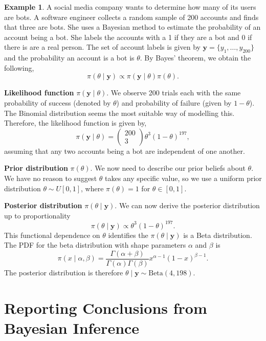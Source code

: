 \documentclass[
]{book}
\theoremstyle{definition}
\theoremstyle{definition}
\newtheorem{example}{Example}[chapter]
\theoremstyle{definition}
\theoremstyle{definition}
\theoremstyle{remark}
\begin{document}
\begin{example}
\protect\hypertarget{exm:binom}{}\label{exm:binom}A social media company wants to determine how many of its users are bots. A software engineer collects a random sample of 200 accounts and finds that three are bots. She uses a Bayesian method to estimate the probability of an account being a bot. She labels the accounts with a 1 if they are a bot and 0 if there is are a real person. The set of account labels is given by \(\boldsymbol{y} = \{y_1, \ldots, y_{200}\}\) and the probability an account is a bot is \(\theta\). By Bayes' theorem, we obtain the following,
\[
\pi(\theta \mid \boldsymbol{y}) \propto \pi(\boldsymbol{y}\mid \theta) \pi(\theta).
\]

\textbf{Likelihood function} \(\pi(\boldsymbol{y}\mid \theta)\). We observe 200 trials each with the same probability of success (denoted by \(\theta\)) and probability of failure (given by \(1-\theta\)). The Binomial distribution seems the most suitable way of modelling this. Therefore, the likelihood function is given by,
\[
\pi(\boldsymbol{y}\mid \theta) = \begin{pmatrix} 200 \\ 3 \end{pmatrix} \theta^3(1-\theta)^{197},
\]
assuming that any two accounts being a bot are independent of one another.

\textbf{Prior distribution} \(\pi(\theta)\). We now need to describe our prior beliefs about \(\theta\). We have no reason to suggest \(\theta\) takes any specific value, so we use a uniform prior distribution \(\theta \sim U[0, 1]\), where \(\pi(\theta) = 1\) for \(\theta \in [0, 1]\).

\textbf{Posterior distribution} \(\pi(\theta \mid \boldsymbol{y})\). We can now derive the posterior distribution up to proportionality
\[
\pi(\theta \mid \boldsymbol{y}) \propto \theta^3(1-\theta)^{197}. 
\]
This functional dependence on \(\theta\) identifies the \(\pi(\theta \mid \boldsymbol{y})\) is a Beta distribution. The PDF for the beta distribution with shape parameters \(\alpha\) and \(\beta\) is
\[
\pi(x \mid \alpha, \beta) = \frac{\Gamma(\alpha + \beta)}{\Gamma(\alpha)\Gamma(\beta)}x^{\alpha - 1}(1-x)^{\beta - 1}. 
\]
The posterior distribution is therefore \(\theta \mid \boldsymbol{y} \sim \textrm{Beta}(4, 198)\).
\end{example}

\section{Reporting Conclusions from Bayesian Inference}\label{reporting-conclusions-from-bayesian-inference}
\end{document}

